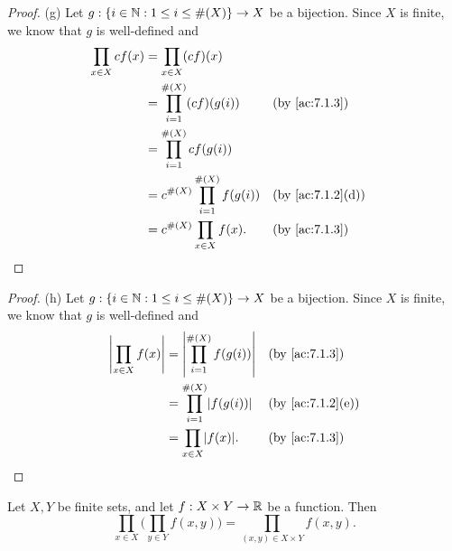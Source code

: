 \begin{proof}{(g)}
  Let \(g : \left\lbrace i \in \mathbb{N} : 1 \leq i \leq \#(X)\right\rbrace \to X\) be a bijection.
  Since \(X\) is finite, we know that \(g\) is well-defined and
  \begin{align*}
    \prod_{x \in X} cf(x) & = \prod_{x \in X} (cf)(x)                                                     \\
                          & = \prod_{i = 1}^{\#(X)} (cf)(g(i))        &  & \by{ac:7.1.3}                  \\
                          & = \prod_{i = 1}^{\#(X)} cf(g(i))                                              \\
                          & = c^{\#(X)} \prod_{i = 1}^{\#(X)} f(g(i)) &  & \text{(by \cref{ac:7.1.2}(d))} \\
                          & = c^{\#(X)} \prod_{x \in X} f(x).         &  & \by{ac:7.1.3}
  \end{align*}
\end{proof}

\begin{proof}{(h)}
  Let \(g : \left\lbrace i \in \mathbb{N} : 1 \leq i \leq \#(X)\right\rbrace \to X\) be a bijection.
  Since \(X\) is finite, we know that \(g\) is well-defined and
  \begin{align*}
    \abs{\prod_{x \in X} f(x)} & = \abs{\prod_{i = 1}^{\#(X)} f(g(i))} &  & \by{ac:7.1.3}                  \\
                               & = \prod_{i = 1}^{\#(X)} \abs{f(g(i))} &  & \text{(by \cref{ac:7.1.2}(e))} \\
                               & = \prod_{x \in X} \abs{f(x)}.         &  & \by{ac:7.1.3}
  \end{align*}
\end{proof}

\begin{ac}\label{ac:7.1.6}
  Let \(X, Y\) be finite sets, and let \(f : X \times Y \to \mathbb{R}\) be a function.
  Then
  \[
    \prod_{x \in X} \bigg(\prod_{y \in Y} f(x, y)\bigg) = \prod_{(x, y) \in X \times Y} f(x, y).
  \]
\end{ac}

